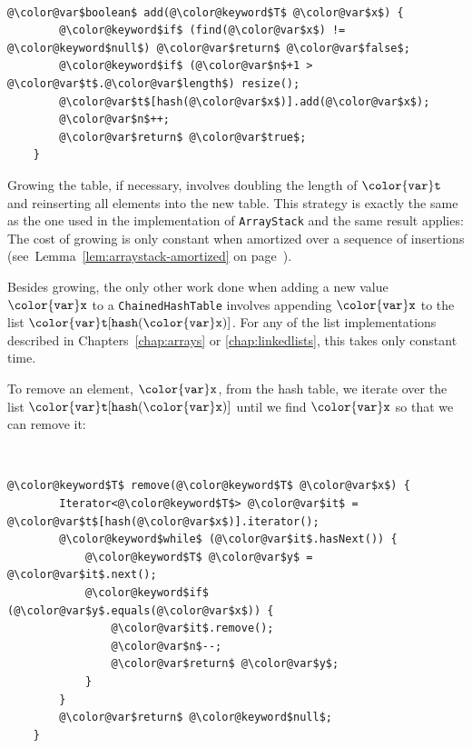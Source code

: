 \documentclass[10pt]{book}
\theoremstyle{plain}
\newcommand{\lemref}[1]{Lemma~\ref{lem:#1}}
\theoremstyle{definition}
\begin{document}
 \ \vspace{.5ex}\begin{Verbatim}[gobble=1,tabsize=2,frame=single,framerule=1.2pt,commandchars=\\@\$,label=\texttt{ChainedHashTable},labelposition=topline]
	@\color@var$boolean$ add(@\color@keyword$T$ @\color@var$x$) {
		@\color@keyword$if$ (find(@\color@var$x$) != @\color@keyword$null$) @\color@var$return$ @\color@var$false$;
		@\color@keyword$if$ (@\color@var$n$+1 > @\color@var$t$.@\color@var$length$) resize();
		@\color@var$t$[hash(@\color@var$x$)].add(@\color@var$x$);
		@\color@var$n$++;
		@\color@var$return$ @\color@var$true$;
	}
\end{Verbatim}

Growing the table,
if necessary, involves doubling the length of \ensuremath{\mathtt{{\color{var}t}}} and reinserting
all elements into the new table.  This strategy is exactly the same
as the one used in the implementation of \texttt{ArrayStack} and the same
result applies: The cost of growing is only constant when amortized
over a sequence of insertions (see~\lemref{arraystack-amortized} on
page~\pageref{lem:arraystack-amortized}).

Besides growing, the only other work done when adding a new value \ensuremath{\mathtt{{\color{var}x}}} to a
\texttt{ChainedHashTable} involves appending \ensuremath{\mathtt{{\color{var}x}}} to the list \ensuremath{\mathtt{{\color{var}t}[hash({\color{var}x})]}}.  For
any of the list implementations described in Chapters~\ref{chap:arrays}
or \ref{chap:linkedlists}, this takes only constant time.

To remove an element, \ensuremath{\mathtt{{\color{var}x}}}, from the hash table, we iterate over the list
\ensuremath{\mathtt{{\color{var}t}[hash({\color{var}x})]}} until we find \ensuremath{\mathtt{{\color{var}x}}} so that we can remove it:


 \ \vspace{.5ex}\begin{Verbatim}[gobble=1,tabsize=2,frame=single,framerule=1.2pt,commandchars=\\@\$,label=\texttt{ChainedHashTable},labelposition=topline]
	@\color@keyword$T$ remove(@\color@keyword$T$ @\color@var$x$) {
		Iterator<@\color@keyword$T$> @\color@var$it$ = @\color@var$t$[hash(@\color@var$x$)].iterator();
		@\color@keyword$while$ (@\color@var$it$.hasNext()) {
			@\color@keyword$T$ @\color@var$y$ = @\color@var$it$.next();
			@\color@keyword$if$ (@\color@var$y$.equals(@\color@var$x$)) {
				@\color@var$it$.remove();
				@\color@var$n$--;
				@\color@var$return$ @\color@var$y$;
			}
		}
		@\color@var$return$ @\color@keyword$null$;
	}
\end{Verbatim}
\end{document}

